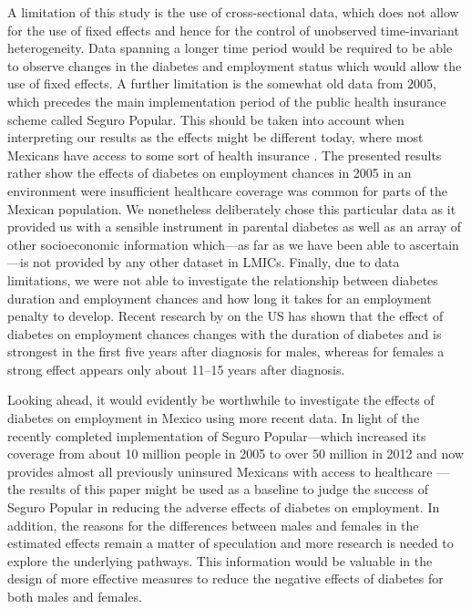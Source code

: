 A limitation of this study is the use of cross-sectional
data, which does not allow for the use of fixed effects and hence
for the control of unobserved time-invariant heterogeneity. Data spanning
a longer time period would be required to be able
to observe changes in the diabetes and employment status which would
allow the use of fixed effects. A further limitation is the somewhat
old data from 2005, which precedes the main implementation period
of the public health insurance scheme called Seguro Popular. This
should be taken into account when interpreting our results as the
effects might be different today, where most Mexicans have access
to some sort of health insurance \parencite{Knaul2012}. The presented
results rather show the effects of diabetes on employment chances
in 2005 in an environment were insufficient healthcare coverage was
common for parts of the Mexican population. We nonetheless deliberately chose
this particular data as it provided us with a sensible instrument
in parental diabetes as well as an array of other socioeconomic information
which---as far as we have been able to ascertain---is not provided
by any other dataset in \acp{LMIC}. Finally, due to data limitations,
we were not able to investigate the relationship between diabetes
duration and employment chances and how long it takes for an employment
penalty to develop. Recent research by \textcite{Minor2013} on the US
has shown that the effect of diabetes on employment chances changes
with the duration of diabetes and is strongest in the first five years
after diagnosis for males, whereas for females a strong effect appears
only about 11--15 years after diagnosis.

Looking ahead, it would evidently be worthwhile to investigate
the effects of diabetes on employment in Mexico using more recent
data. In light of the recently completed implementation of  Seguro
Popular---which increased its coverage from about 10 million people
in 2005 to over 50 million in 2012 and now provides almost all previously
uninsured Mexicans with access to healthcare \parencite{Knaul2012}---the results of this paper might be used as a baseline to judge the
success of Seguro Popular in reducing the adverse effects of diabetes
on employment. In addition, the reasons for the differences between
males and females in the estimated effects remain a matter of speculation
and more research is needed to explore the underlying pathways. This
information would be valuable in the design of more effective measures
to reduce the negative effects of diabetes for both males and females.


